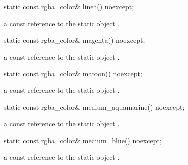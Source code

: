 \begin{itemdecl}
    static const rgba_color& linen() noexcept;
\end{itemdecl}
\begin{itemdescr}
    \pnum
    \returns
    a const reference to the static  object .
\end{itemdescr}

\begin{itemdecl}
    static const rgba_color& magenta() noexcept;
\end{itemdecl}
\begin{itemdescr}
    \pnum
    \returns
    a const reference to the static  object .
\end{itemdescr}

\begin{itemdecl}
    static const rgba_color& maroon() noexcept;
\end{itemdecl}
\begin{itemdescr}
    \pnum
    \returns
    a const reference to the static  object .
\end{itemdescr}

\begin{itemdecl}
    static const rgba_color& medium_aquamarine() noexcept;
\end{itemdecl}
\begin{itemdescr}
    \pnum
    \returns
    a const reference to the static  object .
\end{itemdescr}

\begin{itemdecl}
    static const rgba_color& medium_blue() noexcept;
\end{itemdecl}
\begin{itemdescr}
    \pnum
    \returns
    a const reference to the static  object .
\end{itemdescr}

